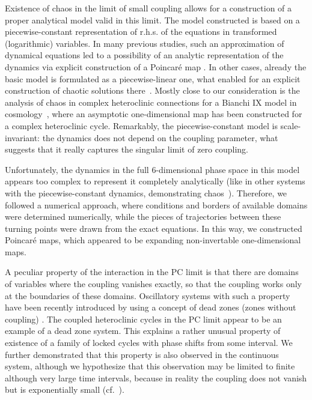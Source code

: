 \documentclass[3p,number,review,sort&compress]{elsarticle}
\begin{document}
Existence of chaos in the limit of small coupling allows for a construction of a proper analytical model valid in this limit. The model constructed is based 
on a piecewise-constant representation of r.h.s. of the equations in transformed (logarithmic) variables. In many previous studies, such an approximation of dynamical equations led to a possibility of an analytic representation of the dynamics via explicit construction of a Poincar\'e map \cite{Pikovsky-Rabinovich-78,Kijashko-Pikovsky-Rabinovich-80,Pikovsky-Rabinovich-81,guckenheimer2006chaotic}. In other cases, already the basic
model is formulated as a piecewise-linear one, what enabled for an explicit construction of chaotic solutions there~\cite{belykh2019lorenz,belykh2020bifurcations,belykh2021sliding}. Mostly
close to our consideration is the analysis of chaos in complex 
heteroclinic connections for a Bianchi IX model in cosmology~\cite{bogoyavlenskii1973singularities,bogoyavlenskii1976homogeneous},
where an asymptotic one-dimensional map has been constructed for a complex heteroclinic cycle. 
Remarkably, the piecewise-constant model is scale-invariant: the dynamics
does not depend on the coupling parameter, what suggests that it really captures the singular limit of zero coupling. 

Unfortunately, the dynamics in the full 6-dimensional phase space in this model appears too complex to represent it completely analytically (like in other systems with the piecewise-constant dynamics, demonstrating chaos~\cite{schurmann1995entropy,peters2003hybrid,blank2004switched}). Therefore, we followed a numerical approach, where conditions and borders of available domains were determined numerically, while the pieces of trajectories between these turning points were drawn from the exact equations. In this way, we constructed Poincar\'e maps, which appeared to be expanding non-invertable
one-dimensional maps. 

A peculiar property of the interaction in the PC limit is that there are domains
of variables where the coupling vanishes exactly, so that the coupling works
only at the boundaries of these domains. Oscillatory systems with such a property
have been recently introduced by using a concept of dead zones (zones without coupling) \cite{ashwin2019state,ashwin2021dead}. The coupled heteroclinic cycles 
in the PC limit appear to be an example of a dead zone system. This explains a rather unusual property of existence of a family of locked cycles with phase shifts from some interval. We further demonstrated that this property is also observed in the continuous system, although we hypothesize that this observation may be limited to finite although very large time intervals, because in reality the coupling does not vanish but is exponentially small (cf.~\cite{Bolotov-Osipov-Pikovsky-16}). 
\end{document}
